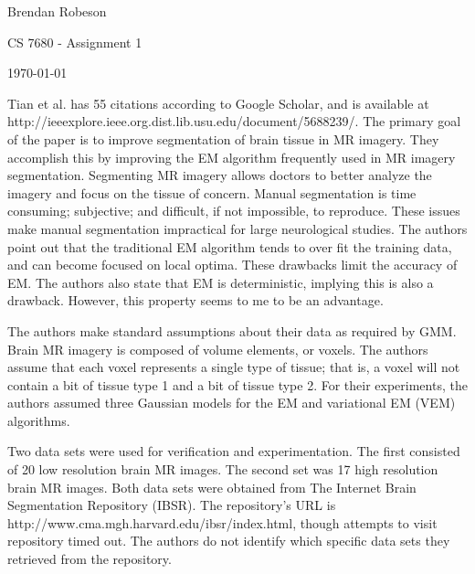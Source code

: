\documentclass[11pt]{article}
\begin{document}
\noindent Brendan Robeson

\noindent CS 7680 - Assignment 1

\noindent \today

\medskip

Tian et al. \cite{5688239} has 55 citations according to Google Scholar, and is
available at \\ http://ieeexplore.ieee.org.dist.lib.usu.edu/document/5688239/.
The primary goal of the paper is to improve segmentation of brain tissue in MR
imagery. They accomplish this by improving the EM algorithm frequently used in
MR imagery segmentation. Segmenting MR imagery allows doctors to better analyze
the imagery and focus on the tissue of concern. Manual segmentation is time
consuming; subjective; and difficult, if not impossible, to reproduce. These
issues make manual segmentation impractical for large neurological studies. The
authors point out that the traditional EM algorithm tends to over fit the
training data, and can become focused on local optima. These drawbacks limit the
accuracy of EM. The authors also state that EM is deterministic, implying this
is also a drawback. However, this property seems to me to be an advantage.

The authors make standard assumptions about their data as required by GMM. Brain
MR imagery is composed of volume elements, or voxels. The authors assume that
each voxel represents a single type of tissue; that is, a voxel will not contain
a bit of tissue type 1 and a bit of tissue type 2. For their experiments, the
authors assumed three Gaussian models for the EM and variational EM (VEM)
algorithms.

Two data sets were used for verification and experimentation. The first
consisted of 20 low resolution brain MR images. The second set was 17 high
resolution brain MR images. Both data sets were obtained from The Internet Brain
Segmentation Repository (IBSR). The repository's URL is
http://www.cma.mgh.harvard.edu/ibsr/index.html, though attempts to visit
repository timed out. The authors do not identify which specific data sets they
retrieved from the repository.
\end{document}
